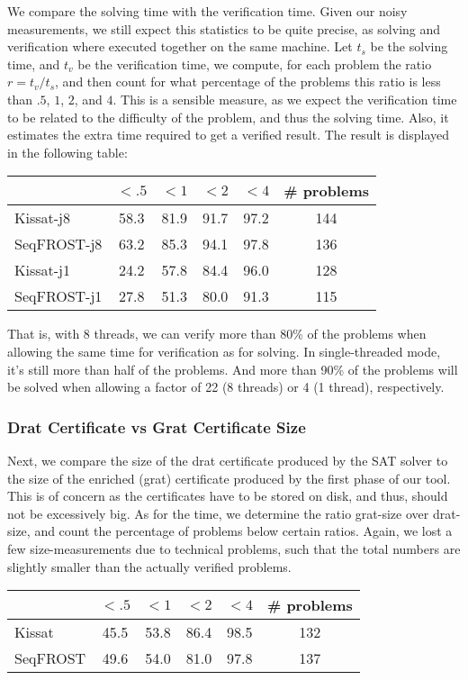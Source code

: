 \documentclass{llncs}     %
\begin{document}
  We compare the solving time with the verification time. Given our noisy measurements, we still expect this statistics to be quite precise, as solving and verification where executed together on the same machine. Let $t_s$ be the solving time, and $t_v$ be the verification time, we compute, for each problem the ratio $r=t_v/t_s$, and then count for what percentage of the problems this ratio is less than $.5$, $1$, $2$, and $4$. This is a sensible measure, as we expect the verification time to be related to the difficulty of the problem, and thus the solving time. Also, it estimates the extra time required to get a verified result.
  The result is displayed in the following table:

  \begin{tabular}{|l|c|c|c|c|c|}\hline
                & $<.5$ & $<1$ & $<2$ & $<4$ & \# problems\\
    \hline\hline
    Kissat-j8   & 58.3 & 81.9 & 91.7 & 97.2  & 144 \\
    SeqFROST-j8 & 63.2 & 85.3 & 94.1 & 97.8  & 136 \\
    Kissat-j1   & 24.2 & 57.8 & 84.4 & 96.0  & 128 \\
    SeqFROST-j1 & 27.8 & 51.3 & 80.0 & 91.3  & 115 \\
    \hline
  \end{tabular}

  That is, with 8 threads, we can verify more than 80\% of the problems when allowing the same time for verification as for solving. In single-threaded mode, it's still more than half of the problems. And more than 90\% of the problems will be solved when allowing a factor of 22 (8 threads) or 4 (1 thread), respectively.

  \subsubsection{Drat Certificate vs Grat Certificate Size}
  Next, we compare the size of the drat certificate produced by the SAT solver to the size of the enriched (grat) certificate produced by the first phase of our tool. This is of concern as the certificates have to be stored on disk, and thus, should not be excessively big. As for the time, we determine the ratio grat-size over drat-size, and count the percentage of problems below certain ratios. Again, we lost a few size-measurements due to technical problems, such that the total numbers are slightly smaller than the actually verified problems.

  \begin{tabular}{|l|c|c|c|c|c|}\hline
                & $<.5$ & $<1$ & $<2$ & $<4$ & \# problems\\
    \hline\hline
    Kissat      & 45.5  & 53.8 & 86.4 & 98.5 & 132\\
    SeqFROST    & 49.6  & 54.0 & 81.0 & 97.8 & 137\\
    \hline
  \end{tabular}
\end{document}
